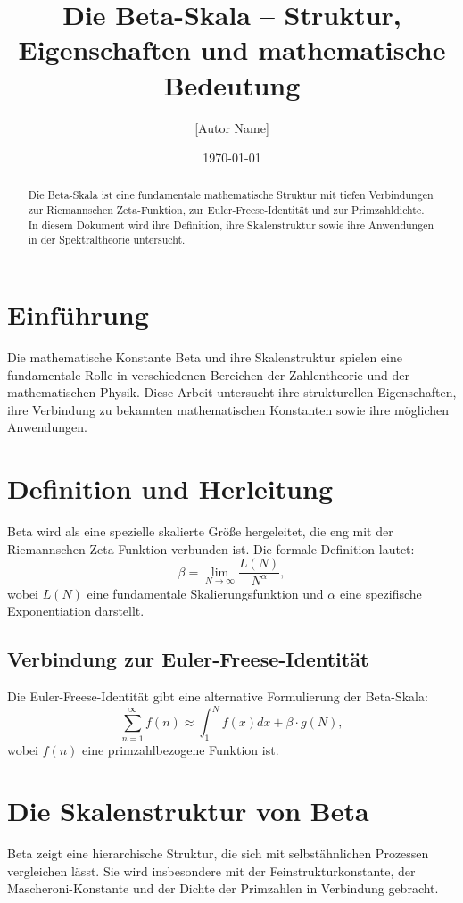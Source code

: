\documentclass[a4paper,11pt]{article}
\title{Die Beta-Skala – Struktur, Eigenschaften und mathematische Bedeutung}
\author{[Autor Name]}
\date{\today}
\begin{document}
\maketitle

\begin{abstract}
Die Beta-Skala ist eine fundamentale mathematische Struktur mit tiefen Verbindungen zur Riemannschen Zeta-Funktion, zur Euler-Freese-Identität und zur Primzahldichte. In diesem Dokument wird ihre Definition, ihre Skalenstruktur sowie ihre Anwendungen in der Spektraltheorie untersucht.
\end{abstract}

\section{Einführung}
Die mathematische Konstante Beta und ihre Skalenstruktur spielen eine fundamentale Rolle in verschiedenen Bereichen der Zahlentheorie und der mathematischen Physik. Diese Arbeit untersucht ihre strukturellen Eigenschaften, ihre Verbindung zu bekannten mathematischen Konstanten sowie ihre möglichen Anwendungen.

\section{Definition und Herleitung}
Beta wird als eine spezielle skalierte Größe hergeleitet, die eng mit der Riemannschen Zeta-Funktion verbunden ist. Die formale Definition lautet:
\begin{equation}
    \beta = \lim_{N \to \infty} \frac{L(N)}{N^{\alpha}},
\end{equation}
wobei $L(N)$ eine fundamentale Skalierungsfunktion und $\alpha$ eine spezifische Exponentiation darstellt.

\subsection{Verbindung zur Euler-Freese-Identität}
Die Euler-Freese-Identität gibt eine alternative Formulierung der Beta-Skala:
\begin{equation}
    \sum_{n=1}^{\infty} f(n) \approx \int_{1}^{N} f(x) dx + \beta \cdot g(N),
\end{equation}
wobei $f(n)$ eine primzahlbezogene Funktion ist.

\section{Die Skalenstruktur von Beta}
Beta zeigt eine hierarchische Struktur, die sich mit selbstähnlichen Prozessen vergleichen lässt. Sie wird insbesondere mit der Feinstrukturkonstante, der Mascheroni-Konstante und der Dichte der Primzahlen in Verbindung gebracht.
\end{document}
